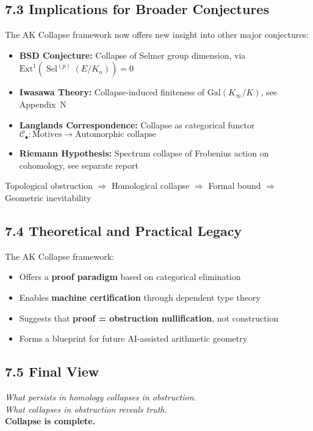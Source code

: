 \documentclass[11pt]{article}
\DeclareMathOperator{\Sel}{Sel}
\begin{document}
\subsection{7.3 Implications for Broader Conjectures}

The AK Collapse framework now offers new insight into other major conjectures:

\begin{itemize}
  \item \textbf{BSD Conjecture:} Collapse of Selmer group dimension, via \( \mathrm{Ext}^1(\Sel^{(p)}(E/K_n)) = 0 \)
  \item \textbf{Iwasawa Theory:} Collapse-induced finiteness of \( \mathrm{Gal}(K_\infty/K) \), see Appendix~N
  \item \textbf{Langlands Correspondence:} Collapse as categorical functor \( \mathcal{C}_\bullet: \text{Motives} \to \text{Automorphic collapse} \)
  \item \textbf{Riemann Hypothesis:} Spectrum collapse of Frobenius action on cohomology, see separate report
\end{itemize}

Topological obstruction \( \Rightarrow \) Homological collapse \( \Rightarrow \) Formal bound \( \Rightarrow \) Geometric inevitability


\subsection{7.4 Theoretical and Practical Legacy}

The AK Collapse framework:
\begin{itemize}
  \item Offers a \textbf{proof paradigm} based on categorical elimination
  \item Enables \textbf{machine certification} through dependent type theory
  \item Suggests that \textbf{proof = obstruction nullification}, not construction
  \item Forms a blueprint for future AI-assisted arithmetic geometry
\end{itemize}

\subsection{7.5 Final View}

\begin{center}
\textit{What persists in homology collapses in obstruction.} \\
\textit{What collapses in obstruction reveals truth.} \\
\textbf{Collapse is complete.}
\end{center}
\end{document}
